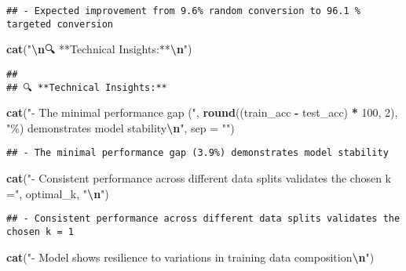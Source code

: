 \documentclass[
]{article}
\newenvironment{Shaded}{\begin{snugshade}}{\end{snugshade}}
\newcommand{\AttributeTok}[1]{\textcolor[rgb]{0.13,0.29,0.53}{#1}}
\newcommand{\DecValTok}[1]{\textcolor[rgb]{0.00,0.00,0.81}{#1}}
\newcommand{\FunctionTok}[1]{\textcolor[rgb]{0.13,0.29,0.53}{\textbf{#1}}}
\newcommand{\NormalTok}[1]{#1}
\newcommand{\SpecialCharTok}[1]{\textcolor[rgb]{0.81,0.36,0.00}{\textbf{#1}}}
\newcommand{\StringTok}[1]{\textcolor[rgb]{0.31,0.60,0.02}{#1}}
\begin{document}
\begin{verbatim}
## - Expected improvement from 9.6% random conversion to 96.1 % targeted conversion
\end{verbatim}

\begin{Shaded}
\begin{Highlighting}[]
\FunctionTok{cat}\NormalTok{(}\StringTok{"}\SpecialCharTok{\textbackslash{}n}\StringTok{🔍 **Technical Insights:**}\SpecialCharTok{\textbackslash{}n}\StringTok{"}\NormalTok{)}
\end{Highlighting}
\end{Shaded}

\begin{verbatim}
## 
## 🔍 **Technical Insights:**
\end{verbatim}

\begin{Shaded}
\begin{Highlighting}[]
\FunctionTok{cat}\NormalTok{(}\StringTok{"{-} The minimal performance gap ("}\NormalTok{, }\FunctionTok{round}\NormalTok{((train\_acc }\SpecialCharTok{{-}}\NormalTok{ test\_acc) }\SpecialCharTok{*} \DecValTok{100}\NormalTok{, }\DecValTok{2}\NormalTok{), }\StringTok{"\%) demonstrates model stability}\SpecialCharTok{\textbackslash{}n}\StringTok{"}\NormalTok{, }\AttributeTok{sep =} \StringTok{""}\NormalTok{)}
\end{Highlighting}
\end{Shaded}

\begin{verbatim}
## - The minimal performance gap (3.9%) demonstrates model stability
\end{verbatim}

\begin{Shaded}
\begin{Highlighting}[]
\FunctionTok{cat}\NormalTok{(}\StringTok{"{-} Consistent performance across different data splits validates the chosen k ="}\NormalTok{, optimal\_k, }\StringTok{"}\SpecialCharTok{\textbackslash{}n}\StringTok{"}\NormalTok{)}
\end{Highlighting}
\end{Shaded}

\begin{verbatim}
## - Consistent performance across different data splits validates the chosen k = 1
\end{verbatim}

\begin{Shaded}
\begin{Highlighting}[]
\FunctionTok{cat}\NormalTok{(}\StringTok{"{-} Model shows resilience to variations in training data composition}\SpecialCharTok{\textbackslash{}n}\StringTok{"}\NormalTok{)}
\end{Highlighting}
\end{Shaded}
\end{document}

